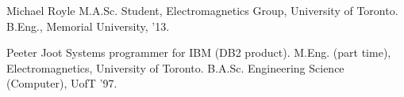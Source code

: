 %
%

\begin{IEEEbiography}{Michael Royle}
M.A.Sc. Student, Electromagnetics Group, University of Toronto. B.Eng., Memorial University, '13.
\end{IEEEbiography}

\begin{IEEEbiography}{Peeter Joot}
Systems programmer for IBM (DB2 product).  M.Eng. (part time), Electromagnetics, University of Toronto. B.A.Sc. Engineering Science (Computer), UofT '97.
\end{IEEEbiography}
